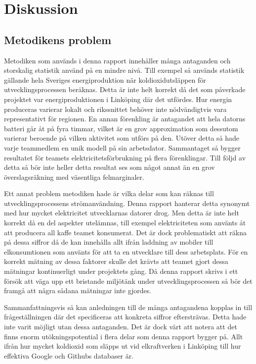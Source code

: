 
\section{Diskussion}
\label{sec:joel_a-discussion}

\subsection{Metodikens problem}
Metodiken som används i denna rapport innehåller många antaganden och storskalig statistik använd på en mindre nivå. Till exempel så används statistik gällande hela Sveriges energiproduktion när koldioxidutsläppen för utvecklingsprocessen beräknas. Detta är inte helt korrekt då det som påverkade projektet var energiproduktionen i Linköping där det utfördes. Hur energin produceras varierar lokalt och rikssnittet behöver inte nödvändigtvis vara representativt för regionen. En annan förenkling är antagandet att hela datorns batteri går åt på fyra timmar, vilket är en grov approximation som dessutom varierar beroende på vilken aktivitet som utförs på den. Utöver detta så hade varje teammedlem en unik modell på sin arbetsdator. Sammantaget så bygger resultatet för teamets elektricitetsförbrukning på flera förenklingar. Till följd av detta så bör inte heller detta resultat ses som något annat än en grov överslagsräkning med väsentliga felmarginaler.

Ett annat problem metodiken hade är vilka delar som kan räknas till utvecklingsprocessens strömanvändning. Denna rapport hanterar detta synonymt med hur mycket elektricitet utvecklarnas datorer drog. Men detta är inte helt korrekt då en del aspekter utelämnas, till exempel elektriciteten som använts åt att producera all kaffe teamet konsumerat. Det är dock problematiskt att räkna på dessa siffror då de kan innehålla allt ifrån laddning av mobiler till elkonsumtionen som använts för att ta en utvecklare till dess arbetsplats. För en korrekt mätning av dessa faktorer skulle det krävts att teamet gjort dessa mätningar kontinuerligt under projektets gång. Då denna rapport skrivs i ett försök att väga upp ett bristande miljötänk under utvecklingsprocessen så bör det framgå att några sådana mätningar inte gjordes.

Sammanfattningsvis så kan anledningen till de många antagandena kopplas in till frågeställningen där det specificeras att konkreta siffror eftersträvas. Detta hade inte varit möjligt utan dessa antaganden. Det är dock värt att notera att det finns enorm utökningspotential i flera delar som denna rapport bygger på. Allt ifrån hur mycket koldioxid som släpps ut vid elkraftverken i Linköping till hur effektiva Google och Githubs databaser är.

